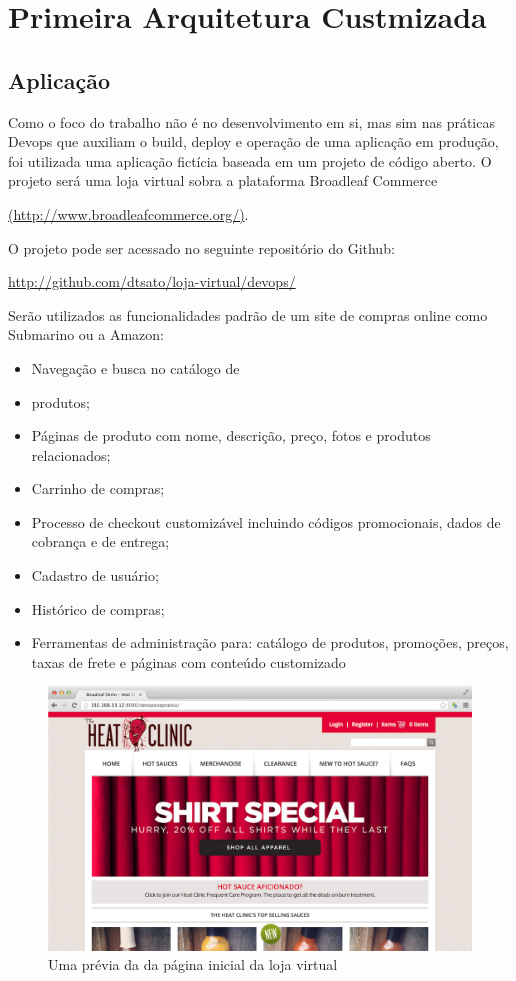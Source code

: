 \section{Primeira Arquitetura Custmizada}

\subsection{Aplicação}

Como o foco do trabalho não é no desenvolvimento em si, mas sim nas práticas Devops que auxiliam o build, deploy e operação de uma aplicação em produção, foi utilizada uma aplicação fictícia baseada em um projeto de código aberto. O projeto será uma loja virtual sobra a plataforma Broadleaf Commerce 

\url {(http://www.broadleafcommerce.org/)}. 

O projeto pode ser acessado no seguinte repositório do Github: 

\url {http://github.com/dtsato/loja-virtual/devops/}

Serão utilizados as funcionalidades padrão de um site de compras online como Submarino ou a Amazon:

\begin{itemize}

\item Navegação e busca no catálogo de \item produtos;
\item Páginas de produto com nome, descrição, preço, fotos e produtos relacionados;
\item Carrinho de compras;
\item Processo de checkout customizável incluindo códigos promocionais, dados de cobrança e de entrega;
\item Cadastro de usuário;
\item Histórico de compras;
\item Ferramentas de administração para: catálogo de produtos, promoções, preços, taxas de frete e páginas com conteúdo customizado


\end{itemize}

\begin {figure} [!htb]
\centering
\includegraphics[scale=0.5]{imagens/label_loja}
\caption{Uma prévia da da página inicial da loja virtual}

\end{figure}

